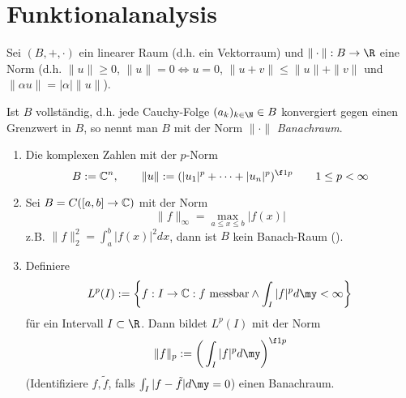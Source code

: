 %

\section{Funktionalanalysis} %


\begin{df} \label{1.1}
	Sei $(B,+,\cdot)$ ein linearer Raum (d.h. ein Vektorraum) und $\|\cdot\|: B \to \R$ eine Norm (d.h. $\|u\| \ge 0$, $\|u\|=0 \iff u = 0$, $\|u+v\| \le \|u\| + \|v\|$ und $\|\alpha u \| = |\alpha| \|u\|$).

	Ist $B$ vollständig, d.h. jede Cauchy-Folge $(a_k)_{k\in \N} \in B$ konvergiert gegen einen Grenzwert in $B$, so nennt man $B$ mit der Norm $\|\cdot\|$ \emph{Banachraum}.
\end{df}

\begin{ex} \label{1.2}
	\begin{enumerate}[1)]
		\item
			Die komplexen Zahlen mit der $p$-Norm
			\[
				B := \C^n,
				\qquad \|u\| := (|u_1|^p + \dotsb + |u_n|^p)^{\f 1p} \qquad 1 \le p < \infty
			\]
		\item
			Sei $B = C([a,b] \to \mathbb{C})$ mit der Norm
			\[
				\|f\|_\infty = \max_{a \le x \le b} |f(x)|
			\]
			z.B. $\|f\|_2^2 = \int_a^b |f(x)|^2 dx$, dann ist $B$ kein Banach-Raum (\fixme[warum?]).
		\item
			Definiere
			\[
				L^p(I) := \bigg\{ f : I \to \C : f \text{ messbar} \land \int_I |f|^p d\my < \infty \bigg\}
			\]
			für ein Intervall $I \subset \R$.
			Dann bildet $L^p(I)$ mit der Norm
			\[
				\|f\|_p := \bigg( \int_I |f|^p d\my \bigg)^{\f 1p}
			\]
			(Identifiziere $f,\tilde f$, falls $\int_I |f-\tilde f| d\my = 0$)
			einen Banachraum.
	\end{enumerate}
\end{ex}


